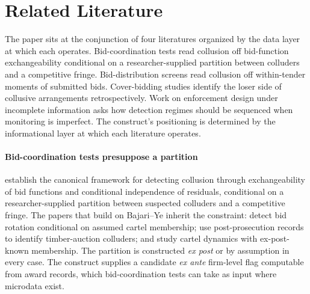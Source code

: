 \section{Related Literature}
\label{sec:literature}

The paper sits at the conjunction of four literatures organized
by the data layer at which each operates. Bid-coordination tests
read collusion off bid-function exchangeability conditional on a
researcher-supplied partition between colluders and a competitive
fringe. Bid-distribution screens read collusion off within-tender
moments of submitted bids. Cover-bidding studies identify the
loser side of collusive arrangements retrospectively. Work on
enforcement design under incomplete information asks how
detection regimes should be sequenced when monitoring is
imperfect. The construct's positioning is determined by the
informational layer at which each literature operates.

\paragraph{Bid-coordination tests presuppose a partition}
\citet{bajari2003deciding} establish the canonical framework for
detecting collusion through exchangeability of bid functions and
conditional independence of residuals, conditional on a
researcher-supplied partition between suspected colluders and a
competitive fringe. The papers that build on Bajari--Ye inherit
the constraint:
\citet{porter1993detection,porter1999ohio} detect bid rotation
conditional on assumed cartel membership;
\citet{baldwin1997bidder} use post-prosecution records to
identify timber-auction colluders; \citet{clark2021collusion}
and \citet{schurter2020identification} study cartel dynamics
with ex-post-known membership. The partition is constructed
\emph{ex post} or by assumption in every case. The construct
supplies a candidate \emph{ex ante} firm-level flag computable
from award records, which bid-coordination tests can take as
input where microdata exist.

